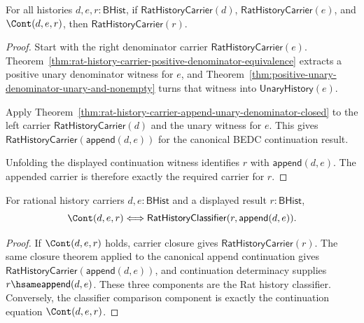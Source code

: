 \begin{theorem}
\label{thm:field-rat-denominator-continuation-carrier-closure}
For all histories $d,e,r:\mathsf{BHist}$, if
$\mathsf{RatHistoryCarrier}(d)$, $\mathsf{RatHistoryCarrier}(e)$, and
$\Cont(d,e,r)$, then $\mathsf{RatHistoryCarrier}(r)$.
\end{theorem}
\begin{proof}
Start with the right denominator carrier $\mathsf{RatHistoryCarrier}(e)$.
Theorem~\ref{thm:rat-history-carrier-positive-denominator-equivalence}
extracts a positive unary denominator witness for $e$, and
Theorem~\ref{thm:positive-unary-denominator-unary-and-nonempty} turns that
witness into $\mathsf{UnaryHistory}(e)$.

Apply Theorem~\ref{thm:rat-history-carrier-append-unary-denominator-closed} to
the left carrier $\mathsf{RatHistoryCarrier}(d)$ and the unary witness for
$e$. This gives $\mathsf{RatHistoryCarrier}(\mathsf{append}(d,e))$ for the
canonical BEDC continuation result.

Unfolding the displayed continuation witness identifies $r$ with
$\mathsf{append}(d,e)$. The appended carrier is therefore exactly the required
carrier for $r$.
\end{proof}

\begin{theorem}
\label{thm:rat-history-classifier-continuation-tail-iff}
For rational history carriers $d,e:\mathsf{BHist}$ and a displayed result
$r:\mathsf{BHist}$,
$$
\Cont(d,e,r)\Longleftrightarrow
\mathsf{RatHistoryClassifier}(r,\mathsf{append}(d,e)).
$$
\end{theorem}
\begin{proof}
If $\Cont(d,e,r)$ holds, carrier closure gives $\mathsf{RatHistoryCarrier}(r)$.
The same closure theorem applied to the canonical append continuation gives
$\mathsf{RatHistoryCarrier}(\mathsf{append}(d,e))$, and continuation
determinacy supplies $r\hsame\mathsf{append}(d,e)$. These three components are
the Rat history classifier. Conversely, the classifier comparison component is
exactly the continuation equation $\Cont(d,e,r)$.
\end{proof}

